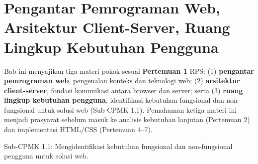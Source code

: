 \documentclass[../main.tex]{subfiles}
\begin{document}
\chapter{Pengantar Pemrograman Web, Arsitektur Client-Server, Ruang Lingkup Kebutuhan Pengguna}

Bab ini menyajikan tiga materi pokok sesuai \textbf{Pertemuan 1} RPS: (1) \textbf{pengantar pemrograman web}, pengenalan konteks dan teknologi web; (2) \textbf{arsitektur client-server}, fondasi komunikasi antara browser dan server; serta (3) \textbf{ruang lingkup kebutuhan pengguna}, identifikasi kebutuhan fungsional dan non-fungsional untuk solusi web (Sub-CPMK 1.1). Pemahaman ketiga materi ini menjadi prasyarat sebelum masuk ke analisis kebutuhan lanjutan (Pertemuan 2) dan implementasi HTML/CSS (Pertemuan 4--7).

\begin{subcpmk}
  \item Sub-CPMK 1.1: Mengidentifikasi kebutuhan fungsional dan non-fungsional pengguna untuk solusi web.
\end{subcpmk}












\end{document}
